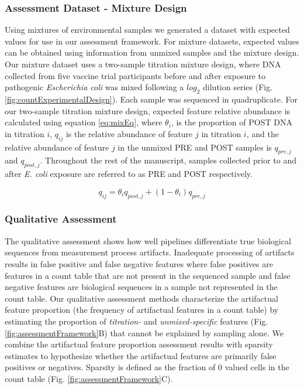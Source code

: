 \documentclass{bmcart}
\begin{document}
\subsubsection*{Assessment Dataset - Mixture Design}

Using mixtures of environmental samples we generated a dataset with expected values for use in our assessment framework. 
For mixture datasets, expected values can be obtained using information from unmixed samples and the mixture design.
Our mixture dataset uses a two-sample titration mixture design, where DNA collected from five vaccine trial participants before and
after exposure to pathogenic \emph{Escherichia coli} was mixed following a \(log_2\) dilution series (Fig. \ref{fig:countExperimentalDesign}).
Each sample was sequenced in quadruplicate.
For our two-sample titration mixture design, expected feature
relative abundance is calculated using equation \eqref{eq:mixEq},
where \(\theta_i\), is the proportion of POST DNA in titration \(i\),
\(q_{ij}\) is the relative abundance of feature \(j\) in titration
\(i\), and the relative abundance of feature \(j\) in the unmixed PRE
and POST samples is \(q_{pre,j}\) and \(q_{post,j}\).
Throughout the rest of the manuscript, samples collected prior to and after \emph{E. coli} exposure are referred to as PRE and POST respectively.

\begin{equation}
  q_{ij} = \theta_i q_{post,j} + (1 - \theta_i) q_{pre,j}
  \label{eq:mixEq}
\end{equation}

\subsubsection*{Qualitative Assessment}
The qualitative assessment shows how well pipelines differentiate true biological sequences from measurement process artifacts.
Inadequate processing of artifacts results in false positive and false negative features where false positives are features in a count table that are not present in the sequenced sample and false negative features are biological sequences in a sample not represented in the count table.
Our qualitative assessment methods characterize the artifactual feature proportion (the frequency of artifactual features in a count table) by estimating the proportion of \emph{titration-} and \emph{unmixed-specific} features (Fig. \ref{fig:assessmentFramework}B) that cannot be explained by sampling alone.
We combine the artifactual feature proportion assessment results with sparsity estimates to hypothesize whether the artifactual features are primarily false positives or negatives.
Sparsity is defined as the fraction of 0 valued cells in the count table (Fig. \ref{fig:assessmentFramework}C).
\end{document}
